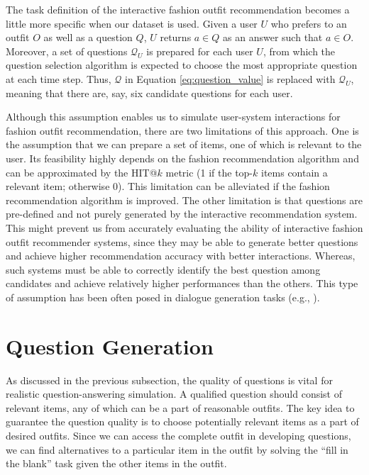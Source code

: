 The task definition of the interactive fashion outfit recommendation becomes a little more specific when our dataset is used.
Given a user $U$ who prefers to an outfit $O$ as well as a question $Q$,
$U$ returns $a \in Q$ as an answer such that $a \in O$.
Moreover, a set of questions $\mathcal{Q}_U$ is prepared for each user $U$, from which the question selection algorithm is expected to choose the most appropriate question at each time step.
Thus, $\mathcal{Q}$ in Equation \ref{eq:question_value} is replaced with $\mathcal{Q}_U$, 
meaning that there are, say, six candidate questions for each user.

Although this assumption enables us to simulate user-system interactions for fashion outfit recommendation, there are two limitations of this approach. 
One is the assumption that we can prepare a set of items,
one of which is relevant to the user.
Its feasibility highly depends on the fashion recommendation algorithm
and can be approximated by the HIT@$k$ metric (1 if the top-$k$ items contain a relevant item; otherwise 0).
This limitation can be alleviated if the fashion recommendation algorithm is improved.
The other limitation is that questions are pre-defined and not purely generated by the interactive recommendation system.
This might prevent us from accurately evaluating the ability 
of interactive fashion outfit recommender systems,
since they may be able to generate better questions and achieve higher recommendation accuracy with better interactions.
Whereas, such systems must be able to correctly 
identify the best question among candidates and achieve relatively higher performances than the others.
This type of assumption has been often posed in 
dialogue generation tasks (e.g., \cite{shang2016overview}). 

\section{Question Generation}

As discussed in the previous subsection, the quality of questions is vital for realistic question-answering simulation. 
A qualified question should consist of relevant items,
any of which can be a part of reasonable outfits. 
The key idea to guarantee the question quality is 
to choose potentially relevant items as a part of desired outfits. 
Since we can access the complete outfit in developing questions,
we can find alternatives to a particular item in the outfit
by solving the ``fill in the blank'' task given the other items in the outfit. 

